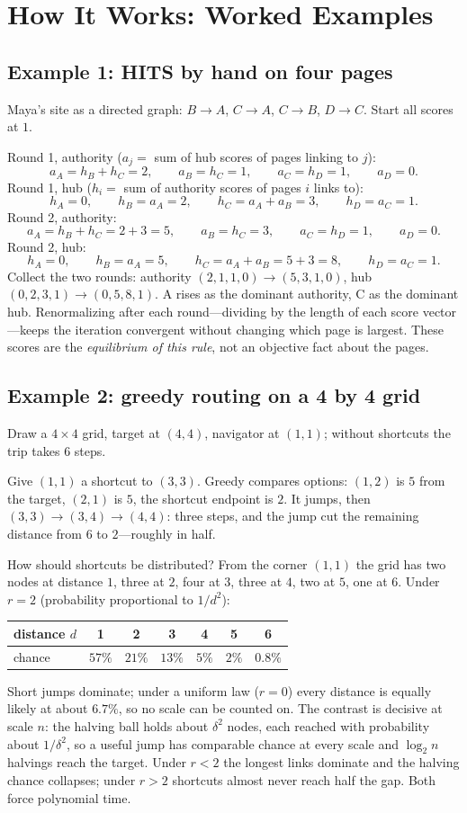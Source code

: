 \section{How It Works: Worked Examples}
\subsection{Example 1: HITS by hand on four pages}
Maya's site as a directed graph: $B\to A$, $C\to A$, $C\to B$, $D\to C$. Start all scores at $1$.

Round 1, authority ($a_j=$ sum of hub scores of pages linking to $j$):
\[
a_A=h_B+h_C=2,\qquad a_B=h_C=1,\qquad a_C=h_D=1,\qquad a_D=0.
\]
Round 1, hub ($h_i=$ sum of authority scores of pages $i$ links to):
\[
h_A=0,\qquad h_B=a_A=2,\qquad h_C=a_A+a_B=3,\qquad h_D=a_C=1.
\]
Round 2, authority:
\[
a_A=h_B+h_C=2+3=5,\qquad a_B=h_C=3,\qquad a_C=h_D=1,\qquad a_D=0.
\]
Round 2, hub:
\[
h_A=0,\qquad h_B=a_A=5,\qquad h_C=a_A+a_B=5+3=8,\qquad h_D=a_C=1.
\]
Collect the two rounds: authority $(2,1,1,0)\to(5,3,1,0)$, hub $(0,2,3,1)\to(0,5,8,1)$. A rises as the dominant authority, C as the dominant hub. Renormalizing after each round---dividing by the length of each score vector---keeps the iteration convergent without changing which page is largest. These scores are the \emph{equilibrium of this rule}, not an objective fact about the pages.

\subsection{Example 2: greedy routing on a 4 by 4 grid}
Draw a $4\times4$ grid, target at $(4,4)$, navigator at $(1,1)$; without shortcuts the trip takes $6$ steps.

Give $(1,1)$ a shortcut to $(3,3)$. Greedy compares options: $(1,2)$ is $5$ from the target, $(2,1)$ is $5$, the shortcut endpoint is $2$. It jumps, then $(3,3)\to(3,4)\to(4,4)$: three steps, and the jump cut the remaining distance from $6$ to $2$---roughly in half.

How should shortcuts be distributed? From the corner $(1,1)$ the grid has two nodes at distance $1$, three at $2$, four at $3$, three at $4$, two at $5$, one at $6$. Under $r=2$ (probability proportional to $1/d^2$):
\begin{center}
\begin{tabular}{lcccccc}
\toprule
distance $d$ & 1 & 2 & 3 & 4 & 5 & 6 \\
\midrule
chance & $57\%$ & $21\%$ & $13\%$ & $5\%$ & $2\%$ & $0.8\%$ \\
\bottomrule
\end{tabular}
\end{center}
Short jumps dominate; under a uniform law ($r=0$) every distance is equally likely at about $6.7\%$, so no scale can be counted on. The contrast is decisive at scale $n$: the halving ball holds about $\delta^{2}$ nodes, each reached with probability about $1/\delta^{2}$, so a useful jump has comparable chance at every scale and $\log_2 n$ halvings reach the target. Under $r<2$ the longest links dominate and the halving chance collapses; under $r>2$ shortcuts almost never reach half the gap. Both force polynomial time.

